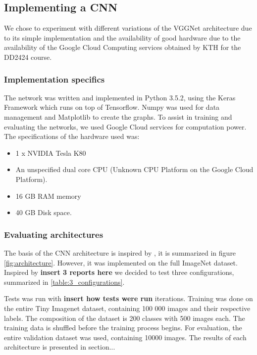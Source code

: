 \documentclass{kthreport}
\begin{document}
\subsection{Implementing a CNN}

We chose to experiment with different variations of the VGGNet architecture due to its simple implementation and the availability of good hardware due to the availability of the Google Cloud Computing services obtained by KTH for the DD2424 course.

\subsubsection{Implementation specifics}

The network was written and implemented in Python 3.5.2, using the Keras Framework which runs on top of Tensorflow. Numpy was used for data management and Matplotlib to create the graphs. To assist in training and evaluating the networks, we used Google Cloud services for computation power. The specifications of the hardware used was:
\begin{itemize}
\item 1 x NVIDIA Tesla K80
\item An unspecified dual core CPU (Unknown CPU Platform on the Google Cloud Platform).
\item 16 GB RAM memory
\item 40 GB Disk space.
\end{itemize}

\subsubsection{Evaluating architectures}

The basis of the CNN architecture is inspired by \cite{NIPS2012_4824}, it is summarized in figure \ref{fig:architecture}. However, it was implemented on the full ImageNet dataset. Inspired by \textbf{insert 3 reports here} we decided to test three configurations, summarized in \ref{table:3_configurations}.


\FloatBarrier


\FloatBarrier


Tests was run with \textbf{insert how tests were run} iterations. Training was done on the entire Tiny Imagenet dataset, containing 100 000 images and their respective labels. The composition of the dataset is 200 classes with 500 images each. The training data is shuffled before the training process begins. For evaluation, the entire validation dataset was used, containing 10000 images. The results of each architecture is presented in section...
\end{document}
